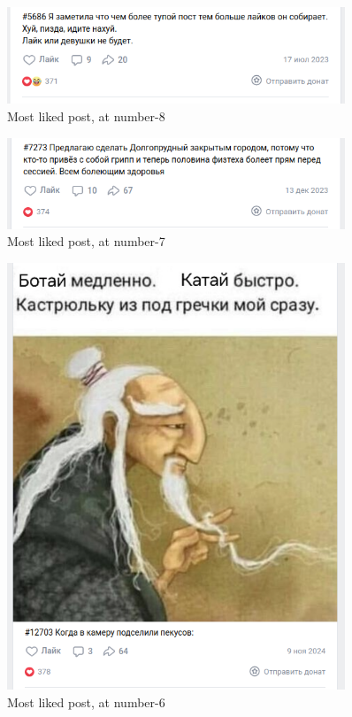 \documentclass[
	12pt
] {article}
\begin{document}
	\newpage	
	\vspace*{\fill}
	\begin{figure}[H]
		\centering
		\includegraphics[width=0.9\textwidth]{fig-top-posts-8}
		\caption{Most liked post, at number-8}
		\label{fig-top-posts-8}
	\end{figure}	
	\vfill
	\begin{figure}[H]
		\centering
		\includegraphics[width=0.9\textwidth]{fig-top-posts-7}
		\caption{Most liked post, at number-7}
		\label{fig-top-posts-7}
	\end{figure}
	\vfill
	
	\newpage	
	\vspace*{\fill}
	\begin{figure}[H]
		\centering
		\includegraphics[width=0.9\textwidth]{fig-top-posts-6}
		\caption{Most liked post, at number-6}
		\label{fig-top-posts-6}
	\end{figure}
	\vfill
	
\end{document}
